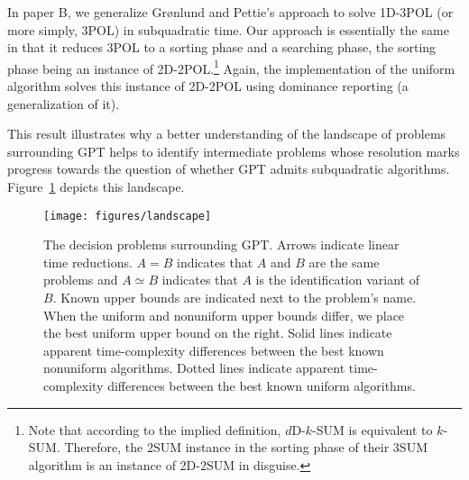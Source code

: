 In paper B, we generalize Gr\o nlund and Pettie's approach to solve 1D-3POL (or
more simply, 3POL) in subquadratic time. Our approach is essentially the same
in that it reduces 3POL to a sorting phase and a searching phase, the sorting
phase being an instance of 2D-2POL.\footnote{Note that according to the implied
definition, \(d\)D-\(k\)-SUM is equivalent to \(k\)-SUM. Therefore, the 2SUM
instance in the sorting phase of their 3SUM algorithm is an instance of 2D-2SUM
in disguise.} Again, the implementation of the uniform algorithm solves this
instance of 2D-2POL using dominance reporting (a generalization of it).

This result illustrates why a better understanding of the landscape of problems
surrounding GPT helps to identify intermediate problems whose resolution marks
progress towards the question of whether GPT admits subquadratic algorithms.
%
Figure~\ref{fig:landscape} depicts this landscape.

\begin{figure}
  \centering{}
  \texttt{[image: figures/landscape]}
  \caption{%
	The decision problems surrounding GPT.
	Arrows indicate linear time reductions. \(A = B\) indicates that
	\(A\) and \(B\) are the same problems and \(A \simeq B\) indicates that
	\(A\) is the identification variant of \(B\).
	Known upper bounds are indicated next to the problem's name.
	When the uniform and nonuniform upper bounds differ, we place the best
	uniform upper bound on the right.
	Solid lines indicate apparent time-complexity differences between the best
	known nonuniform algorithms.
	Dotted lines indicate apparent
	time-complexity differences between the best known uniform algorithms.%
  }%
  \label{fig:landscape}
\end{figure}

